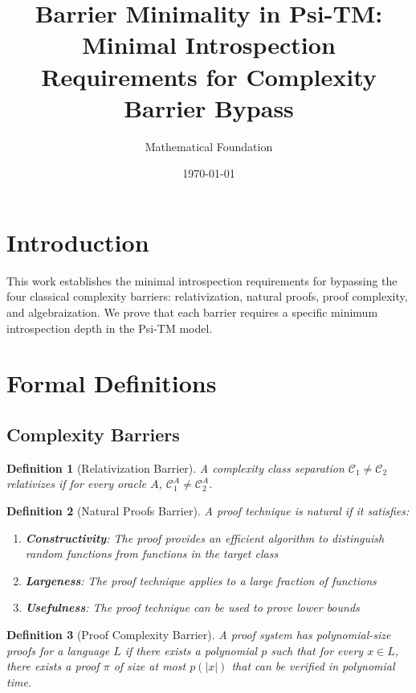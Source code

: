 \documentclass[11pt]{article}
\title{Barrier Minimality in Psi-TM:\\
Minimal Introspection Requirements for Complexity Barrier Bypass}
\author{Mathematical Foundation}
\date{\today}
\newtheorem{definition}{Definition}
\begin{document}
\maketitle

\section{Introduction}

This work establishes the minimal introspection requirements for bypassing the four classical complexity barriers: relativization, natural proofs, proof complexity, and algebraization. We prove that each barrier requires a specific minimum introspection depth in the Psi-TM model.

\section{Formal Definitions}

\subsection{Complexity Barriers}

\begin{definition}[Relativization Barrier]
A complexity class separation $\mathcal{C}_1 \neq \mathcal{C}_2$ relativizes if for every oracle $A$, $\mathcal{C}_1^A \neq \mathcal{C}_2^A$.
\end{definition}

\begin{definition}[Natural Proofs Barrier]
A proof technique is natural if it satisfies:
\begin{enumerate}
\item \textbf{Constructivity}: The proof provides an efficient algorithm to distinguish random functions from functions in the target class
\item \textbf{Largeness}: The proof technique applies to a large fraction of functions
\item \textbf{Usefulness}: The proof technique can be used to prove lower bounds
\end{enumerate}
\end{definition}

\begin{definition}[Proof Complexity Barrier]
A proof system has polynomial-size proofs for a language $L$ if there exists a polynomial $p$ such that for every $x \in L$, there exists a proof $\pi$ of size at most $p(|x|)$ that can be verified in polynomial time.
\end{definition}
\end{document}
